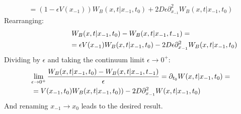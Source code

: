 \documentclass[../template.tex]{subfiles}
\begin{document}
\begin{exo}
\begin{enumerate}
\begin{align*}
            =(1-\epsilon V(x_{-1})) W_B(x,t|x_{-1}, t_0) +2 D \epsilon \partial_{x_{-1}}^2 W_B(x,t|x_{-1}, t_0) 
        \end{align*} 
        Rearranging:
        \begin{align*}
            W_B(x,t|x_{-1}, t_0) -W_B(x,t|x_{-1},t_{-1}) =\span \\
            = \epsilon V(x_{-1})W_B(x,t|x_{-1}, t_0)  - 2D\epsilon \partial_{x_{-1}}^2 W_B(x,t|x_{-1}, t_0) 
        \end{align*}
        Dividing by $\epsilon$ and taking the continuum limit $\epsilon \to 0^+$:
        \begin{align*}
            \lim_{\epsilon \to 0^+} \frac{W_B(x,t|x_{-1}, t_0) -W_B(x,t|x_{-1},t_{-1})}{\epsilon}  = \partial_{t_0} W(x,t|x_{-1},t_0) = \span \\
            &= V(x_{-1},t_0) W_B(x,t|x_{-1},t_0)) - 2 D \partial_{x_{-1}}^2 W(x,t|x_{-1},t_0)
        \end{align*}
        And renaming $x_{-1} \to x_0$ leads to the desired result.
        
    \end{enumerate}
    
\end{exo}
\end{document}
